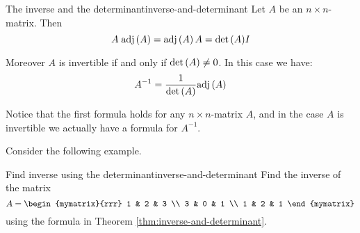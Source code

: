 \begin{theorem}{The inverse and the determinant}{inverse-and-determinant}
Let $A$ be an  $n\times n$-matrix. Then  
\begin{equation*}
A \; \mbox{\rm adj}\left(A\right) = \mbox{\rm adj}\left(A\right)A = {\det \left(A\right)} I
\end{equation*}

Moreover $A$ is invertible if and only if  $\det \left(A\right) \neq 0$. In this case we have: 
\begin{equation*}
A^{-1} = \frac{1}{\det \left(A\right)}  \mbox{\rm adj}\left(A\right)
\end{equation*}
\end{theorem}


Notice that the first formula holds for any $n \times n$-matrix $A$, and in the case $A$ is invertible we actually have a formula for $A^{-1}$.

Consider the following example.

\begin{example}{Find inverse using the determinant}{inverse-and-determinant}
Find the inverse of the matrix
\begin{equation*}
A=\begin{mymatrix}{rrr}
1 & 2 & 3 \\
3 & 0 & 1 \\
1 & 2 & 1
\end{mymatrix}
\end{equation*}
using the formula in Theorem \ref{thm:inverse-and-determinant}.
\end{example}

